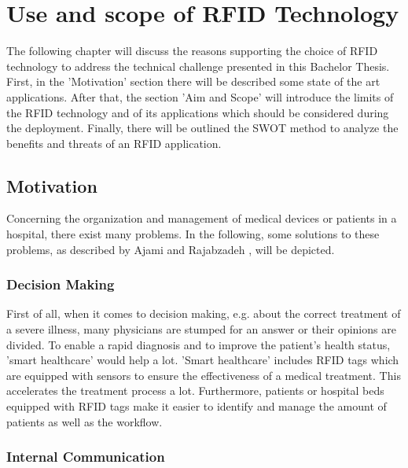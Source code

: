 \chapter{Use and scope of RFID Technology}
\label{Kap1}

The following chapter will discuss the reasons supporting the choice of \ac{RFID} technology to address the technical challenge presented in this Bachelor Thesis. First, in the 'Motivation' section there will be described some state of the art applications. After that, the section 'Aim and Scope' will introduce the limits of the RFID technology and of its applications which should be considered during the deployment. Finally, there will be outlined the \ac{SWOT} method to analyze the benefits and threats of an RFID application.

\section{Motivation}

Concerning the organization and management of medical devices or patients in a hospital, there exist many problems. In the following, some solutions to these problems, as described by Ajami and Rajabzadeh \cite{ncbi}, will be depicted.

\subsection{Decision Making}

First of all, when it comes to decision making, e.g. about the correct treatment of a severe illness, many physicians are stumped for an answer or their opinions are divided. To enable a rapid diagnosis and to improve the patient's health status, 'smart healthcare' \cite{henrici} would help a lot. 'Smart healthcare' includes RFID tags which are equipped with sensors to ensure the effectiveness of a medical treatment. This accelerates the treatment process a lot. Furthermore, patients or hospital beds equipped with RFID tags make it easier to identify and manage the amount of patients as well as the workflow.

\subsection{Internal Communication}

